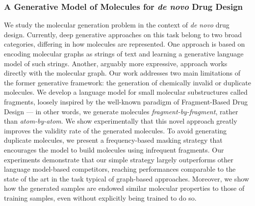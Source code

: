 \subsubsection*{A Generative Model of Molecules for \emph{de novo} Drug Design}
We study the molecular generation problem in the context of \emph{de novo} drug design. Currently, deep generative approaches on this task belong to two broad categories, differing in how molecules are represented. One approach is based on encoding molecular graphs as strings of text and learning a generative language model of such strings. Another, arguably more expressive, approach works directly with the molecular graph. Our work addresses two main limitations of the former generative framework: the generation of chemically invalid or duplicate molecules. We develop a language model for small molecular substructures called fragments, loosely inspired by the well-known paradigm of Fragment-Based Drug Design \citep{erlanson2004fbdd} --- in other words, we generate molecules \emph{fragment-by-fragment}, rather than \emph{atom-by-atom}. We show experimentally that this novel approach greatly improves the validity rate of the generated molecules. To avoid generating duplicate molecules, we present a frequency-based masking strategy that encourages the model to build molecules using infrequent fragments. Our experiments demonstrate that our simple strategy largely outperforms other language model-based competitors, reaching performances comparable to the state of the art in the task typical of graph-based approaches. Moreover, we show how the generated samples are endowed similar molecular properties to those of training samples, even without explicitly being trained to do so.

